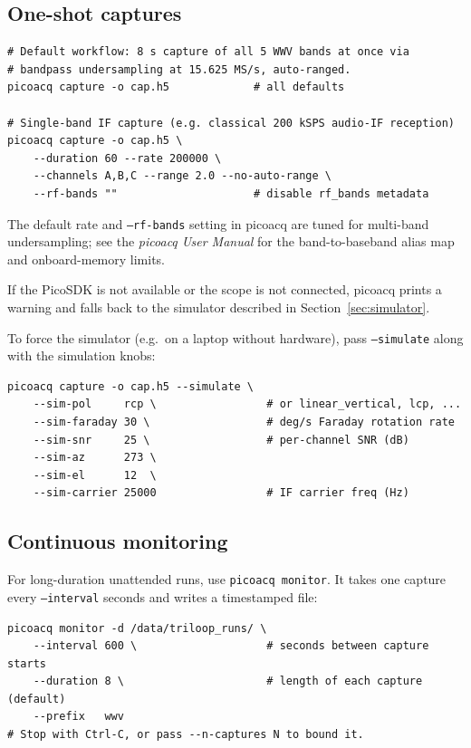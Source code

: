 \documentclass[11pt]{article}
\begin{document}
\subsection{One-shot captures}

\begin{lstlisting}[style=shell]
# Default workflow: 8 s capture of all 5 WWV bands at once via
# bandpass undersampling at 15.625 MS/s, auto-ranged.
picoacq capture -o cap.h5             # all defaults

# Single-band IF capture (e.g. classical 200 kSPS audio-IF reception)
picoacq capture -o cap.h5 \
    --duration 60 --rate 200000 \
    --channels A,B,C --range 2.0 --no-auto-range \
    --rf-bands ""                     # disable rf_bands metadata
\end{lstlisting}

The default rate and \texttt{--rf-bands} setting in \textsf{picoacq}
are tuned for multi-band undersampling; see the \textit{picoacq User
Manual} for the band-to-baseband alias map and onboard-memory limits.

If the PicoSDK is not available or the scope is not connected,
\textsf{picoacq} prints a warning and falls back to the simulator
described in Section~\ref{sec:simulator}.

To force the simulator (e.g.\ on a laptop without hardware), pass
\texttt{--simulate} along with the simulation knobs:

\begin{lstlisting}[style=shell]
picoacq capture -o cap.h5 --simulate \
    --sim-pol     rcp \                 # or linear_vertical, lcp, ...
    --sim-faraday 30 \                  # deg/s Faraday rotation rate
    --sim-snr     25 \                  # per-channel SNR (dB)
    --sim-az      273 \
    --sim-el      12  \
    --sim-carrier 25000                 # IF carrier freq (Hz)
\end{lstlisting}

\subsection{Continuous monitoring}

For long-duration unattended runs, use \texttt{picoacq monitor}.  It
takes one capture every \texttt{--interval} seconds and writes a
timestamped file:

\begin{lstlisting}[style=shell]
picoacq monitor -d /data/triloop_runs/ \
    --interval 600 \                    # seconds between capture starts
    --duration 8 \                      # length of each capture (default)
    --prefix   wwv
# Stop with Ctrl-C, or pass --n-captures N to bound it.
\end{lstlisting}
\end{document}
